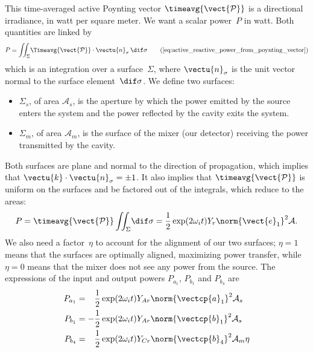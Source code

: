 This time-averaged active Poynting vector $\timeavg{\vect{\mathcal{P}}}$ is a directional irradiance, in watt per square meter.
We want a scalar power~$P$ in watt.
Both quantities are linked by
\begin{equation}
    P
    =
    \iint_\Sigma
    \!
    \Timeavg{\vect{\mathcal{P}}}
    \cdot
    \vectu{n}_\sigma
    \,
    \dif\sigma
    \tag{\ref{eq:active_reactive_power_from_poynting_vector}}
\end{equation}
which is an integration over a surface~$\Sigma$, where $\vectu{n}_\sigma$ is the unit vector normal to the surface element~$\dif\sigma$.
We define two surfaces:
\begin{itemize}
    \item 
        $\Sigma_s$, of area $\mathcal{A}_s$,
        is the aperture by which the power emitted by the source enters the system
        and the power reflected by the cavity exits the system.
    \item
        $\Sigma_m$, of area $\mathcal{A}_m$,
        is the surface of the mixer (our detector) receiving the power transmitted by the cavity.
\end{itemize}
Both surfaces are plane and normal to the direction of propagation,
which implies that $\vectu{k}\cdot\vectu{n}_\sigma=\pm1$.
It also implies that $\timeavg{\vect{\mathcal{P}}}$ is uniform on the surfaces and be factored out of the integrals, which reduce to the areas:
\begin{equation}
    P
    =
    \timeavg{\vect{\mathcal{P}}}
    \iint_\Sigma
    \!
    \dif\sigma
    =
    \frac{1}{2}
    \exp(2\omega_i t)
    Y_r
    \norm{\vect{e}_1}^2
    \mathcal{A}
    \text{.}
\end{equation}
We also need a factor~$\eta$ to account for the alignment of our two surfaces;
$\eta=1$ means that the surfaces are optimally aligned, maximizing power transfer,
while $\eta=0$ means that the mixer does not see any power from the source.
The expressions of the input and output powers $P_{a_1}$, $P_{b_1}$ and $P_{b_4}$ are
\begin{align}
    P_{a_1}
    &=
    \phantom{\mathrel{-}}
    \frac{1}{2}
    \exp(2\omega_i t)
    Y_{Ar}
    \norm{\vectcp{a}_1}^2
    \mathcal{A}_s
    \\%
    P_{b_1}
    &=
    -
    \frac{1}{2}
    \exp(2\omega_i t)
    Y_{Ar}
    \norm{\vectcp{b}_1}^2
    \mathcal{A}_s
    \\%
    P_{b_4}
    &=
    \phantom{\mathrel{-}}
    \frac{1}{2}
    \exp(2\omega_i t)
    Y_{Cr}
    \norm{\vectcp{b}_4}^2
    \mathcal{A}_m
    \eta
\end{align}
